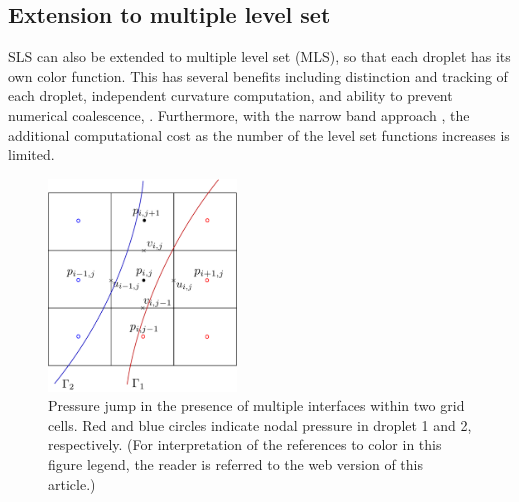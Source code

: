 \subsection{Extension to multiple level set}
\label{subsec: mls}

SLS can also be extended to multiple level set (MLS), so that each droplet has its own color function. This has several benefits including distinction and tracking of each droplet, independent curvature computation, and ability to prevent numerical coalescence, \etc. Furthermore, with the narrow band approach \cite{Adalsteinsson_JCP_1995,Peng_JCP_1999} , the additional computational  cost as the number of the level set functions increases is limited.


\begin{figure}[t]
 \begin{center}
 \includegraphics[width=5cm]{Figures/grid_mls.pdf}
 \end{center}
 \caption{Pressure jump in the presence of multiple interfaces within two grid cells. Red and blue circles indicate nodal pressure in droplet 1 and 2, respectively. (For interpretation of the references to color in this figure legend, the reader is referred to the web version of this article.)}
 \label{fig: GFM close}
\end{figure}

